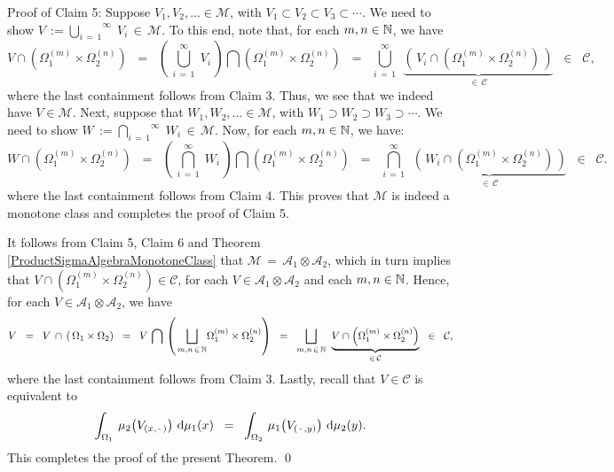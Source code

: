 \vskip 0.5cm
\noindent
Proof of Claim 5:\quad
Suppose $V_{1}, V_{2}, \ldots \in \mathcal{M}$, with $V_{1} \subset V_{2} \subset V_{3} \subset \cdots$.
We need to show $V\,:=\overset{\infty}{\underset{i\,=\,1}{\bigcup}}\;V_{i} \,\in\, \mathcal{M}$.
To this end, note that, for each $m, n \in \mathbb{N}$, we have
\begin{equation*}
V\cap\left(\Omega_{1}^{(m)}\times\Omega_{2}^{(n)}\right)
\;\;=\;\;
	\left(\,\overset{\infty}{\underset{i\,=\,1}{\bigcup}}\;V_{i}\,\right)\bigcap\left(\Omega_{1}^{(m)}\times\Omega_{2}^{(n)}\right)
\;\;=\;\;
	\overset{\infty}{\underset{i\,=\,1}{\bigcup}}\;\,
	\underset{\in\,\mathcal{C}}{\underbrace{\left(\,V_{i}\cap(\Omega_{1}^{(m)}\times\Omega_{2}^{(n)})\,\right)}}
\;\;\in\;\; \mathcal{C},
\end{equation*}
where the last containment follows from Claim 3.
Thus, we see that we indeed have $V \in \mathcal{M}$.
Next, suppose that
$W_{1}, W_{2}, \ldots \in \mathcal{M}$, with $W_{1} \supset W_{2} \supset W_{3} \supset \cdots$.
We need to show $W\,:=\overset{\infty}{\underset{i\,=\,1}{\bigcap}}\;W_{i} \,\in\, \mathcal{M}$.
Now, for each $m, n \in \mathbb{N}$, we have:
\begin{equation*}
W\cap\left(\Omega_{1}^{(m)}\times\Omega_{2}^{(n)}\right)
\;\;=\;\;
	\left(\,\overset{\infty}{\underset{i\,=\,1}{\bigcap}}\;W_{i}\,\right)\bigcap\left(\Omega_{1}^{(m)}\times\Omega_{2}^{(n)}\right)
\;\;=\;\;
	\overset{\infty}{\underset{i\,=\,1}{\bigcap}}\;\,
	\underset{\in\,\mathcal{C}}{\underbrace{\left(\,W_{i}\cap(\Omega_{1}^{(m)}\times\Omega_{2}^{(n)})\,\right)}}
\;\;\in\;\; \mathcal{C}.
\end{equation*}
where the last containment follows from Claim 4.
This proves that $\mathcal{M}$ is indeed a monotone class and completes the proof of Claim 5.

\vskip 0.5cm
\noindent
It follows from Claim 5, Claim 6 and Theorem \ref{ProductSigmaAlgebraMonotoneClass}
that $\mathcal{M} \,=\, \mathcal{A}_{1}\otimes\mathcal{A}_{2}$, which in turn implies that
$V\cap\left(\Omega_{1}^{(m)}\times\Omega_{2}^{(n)}\right) \in \mathcal{C}$, for each
$V \in \mathcal{A}_{1}\otimes\mathcal{A}_{2}$ and each $m, n \in \mathbb{N}$.
Hence, for each $V \in \mathcal{A}_{1}\otimes\mathcal{A}_{2}$, we have
\begin{equation*}
V
\;\; = \;\;
	V \,\cap\, \left(\,\Omega_{1}\times\Omega_{2}\right)
\;\; = \;\;
	V \,\bigcap\, \left(\,\underset{m,n\,\in\,\mathbb{N}}{\bigsqcup}\Omega_{1}^{(m)}\times\Omega_{2}^{(n)}\right)
\;\; = \;\;
	\underset{m,n\,\in\,\mathbb{N}}{\bigsqcup}\;\;
	\underset{\in\,\mathcal{C}}{\underbrace{V\cap\left(\Omega_{1}^{(m)}\times\Omega_{2}^{(n)}\right)}}
\;\; \in \;\;
	\mathcal{C},
\end{equation*}
where the last containment follows from Claim 3.
Lastly, recall that $V \in \mathcal{C}$ is equivalent to
\begin{equation*}
\int_{\Omega_{1}}\, \mu_{2}\!\left(V_{(x,\,\cdot\,)}\right) \,\textnormal{d}\mu_{1}(x)
\;\; = \;\;
\int_{\Omega_{2}}\, \mu_{1}\!\left(V_{(\,\cdot\,,y)}\right) \,\textnormal{d}\mu_{2}(y).
\end{equation*}
This completes the proof of the present Theorem.
\qed


\renewcommand{\theenumi}{\roman{enumi}}
\renewcommand{\labelenumi}{\textnormal{(\theenumi)}$\;\;$}

